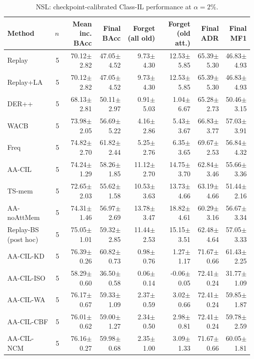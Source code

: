 \begin{table}[t]
\centering\scriptsize
\setlength{\tabcolsep}{3.3pt}
\caption{NSL: checkpoint-calibrated Class-IL performance at $\alpha=2\%$.}\label{tab:forgetting-nsl_kdd}
\begin{tabular}{lrrrrrrr}
\toprule
Method & $n$ & Mean inc. BAcc & Final BAcc & Forget (all old) & Forget (old att.) & Final ADR & Final MF1 \\
\midrule
Replay & 5 & 70.12$\pm$2.82 & 47.05$\pm$4.52 & 9.73$\pm$4.30 & 12.53$\pm$5.85 & 65.39$\pm$5.30 & 46.83$\pm$4.93 \\
Replay+LA & 5 & 70.12$\pm$2.82 & 47.05$\pm$4.52 & 9.73$\pm$4.30 & 12.53$\pm$5.85 & 65.39$\pm$5.30 & 46.83$\pm$4.93 \\
DER++ & 5 & 68.13$\pm$2.81 & 50.11$\pm$2.97 & 0.91$\pm$5.03 & 1.04$\pm$6.67 & 65.28$\pm$2.73 & 50.46$\pm$3.15 \\
WACB & 5 & 73.98$\pm$2.05 & 56.69$\pm$5.22 & 4.16$\pm$2.86 & 5.43$\pm$3.67 & 66.83$\pm$3.77 & 57.03$\pm$3.91 \\
Freq & 5 & 74.82$\pm$2.70 & 61.82$\pm$2.44 & 5.25$\pm$2.76 & 6.35$\pm$3.65 & 69.67$\pm$2.53 & 56.84$\pm$4.32 \\
AA-CIL & 5 & 74.24$\pm$1.29 & 58.26$\pm$1.85 & 11.12$\pm$2.70 & 14.75$\pm$3.70 & 62.84$\pm$3.46 & 55.66$\pm$3.36 \\
TS-mem & 5 & 72.65$\pm$2.03 & 55.62$\pm$1.58 & 10.53$\pm$3.63 & 13.73$\pm$4.66 & 63.19$\pm$4.66 & 51.44$\pm$2.16 \\
AA-noAttMem & 5 & 74.31$\pm$1.46 & 56.97$\pm$2.69 & 13.78$\pm$3.47 & 18.82$\pm$4.61 & 60.29$\pm$3.16 & 56.67$\pm$3.34 \\
Replay-BS (post hoc) & 5 & 75.05$\pm$1.01 & 59.32$\pm$2.85 & 11.44$\pm$2.53 & 15.15$\pm$3.51 & 62.48$\pm$4.64 & 57.05$\pm$3.33 \\
AA-CIL-KD & 5 & 76.39$\pm$0.26 & 60.82$\pm$0.73 & 0.98$\pm$0.76 & 1.27$\pm$1.17 & 71.67$\pm$0.66 & 61.43$\pm$2.25 \\
AA-CIL-ISO & 5 & 58.29$\pm$0.60 & 36.50$\pm$0.58 & 0.06$\pm$0.14 & -0.06$\pm$0.05 & 72.41$\pm$0.24 & 31.77$\pm$1.09 \\
AA-CIL-WA & 5 & 76.17$\pm$0.67 & 59.33$\pm$1.09 & 2.37$\pm$0.59 & 3.02$\pm$0.66 & 72.41$\pm$0.24 & 59.85$\pm$1.87 \\
AA-CIL-CBF & 5 & 76.01$\pm$0.62 & 59.00$\pm$1.27 & 2.34$\pm$0.50 & 2.98$\pm$0.81 & 72.41$\pm$0.24 & 59.78$\pm$2.59 \\
AA-CIL-NCM & 5 & 76.16$\pm$0.27 & 59.98$\pm$0.68 & 2.35$\pm$1.00 & 3.09$\pm$1.33 & 71.67$\pm$0.66 & 60.05$\pm$1.81 \\

\end{tabular}
\end{table}
